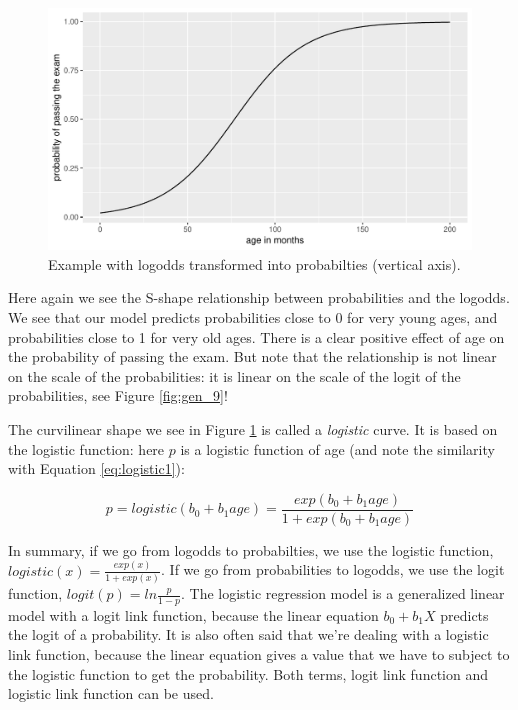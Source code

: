 \documentclass[]{book}\usepackage[]{graphicx}\usepackage[]{color}
\makeatletter
\def\maxwidth{ %
  \ifdim\Gin@nat@width>\linewidth
    \linewidth
  \else
    \Gin@nat@width
  \fi
}
\newenvironment{knitrout}{}{} %
\makeatother
\begin{document}
\begin{knitrout}
\color{fgcolor}\begin{figure}

{\centering \includegraphics[width=\maxwidth]{figure/gen_10-1} 

}

\caption[Example with logodds transformed into probabilties (vertical axis)]{Example with logodds transformed into probabilties (vertical axis).}\label{fig:gen_10}
\end{figure}


\end{knitrout}

Here again we see the S-shape relationship between probabilities and the logodds. We see that our model predicts probabilities close to 0 for very young ages, and probabilities close to 1 for very old ages. There is a clear positive effect of age on the probability of passing the exam. But note that the relationship is not linear on the scale of the probabilities: it is linear on the scale of the logit of the probabilities, see Figure \ref{fig:gen_9}!

The curvilinear shape we see in Figure \ref{fig:gen_10} is called a \textit{logistic} curve. It is based on the logistic function: here $p$ is a logistic function of age (and note the similarity with Equation \ref{eq:logistic1}):


\begin{equation}
p = logistic(b_0 + b_1 age) = \frac{exp(b_0 + b_1 age)}{1+exp(b_0+ b_1 age)} \nonumber
\end{equation}

In summary, if we go from logodds to probabilties, we use the logistic function, $logistic(x)=\frac{exp(x)}{1+exp(x)}$. If we go from probabilities to logodds, we use the logit function, $logit(p)=ln\frac{p}{1-p}$. The logistic regression model is a generalized linear model with a logit link function, because the linear equation $b_0 + b_1 X$ predicts the logit of a probability. It is also often said that we're dealing with a logistic link function, because the linear equation gives a value that we have to subject to the logistic function to get the probability. Both terms, logit link function and logistic link function can be used.
\end{document}
